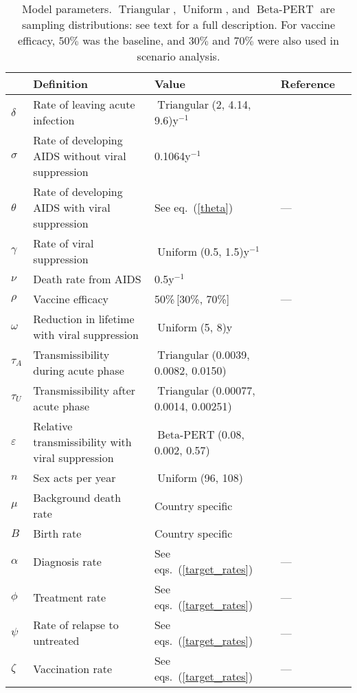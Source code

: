 \documentclass[11pt]{article}
\DeclareMathOperator{\Uniform}{Uniform}
\DeclareMathOperator{\Triangular}{Triangular}
\DeclareMathOperator{\BetaPERT}{Beta-PERT}
\begin{document}
\begin{table}
  \begin{center}
    \begin{tabularx}{\textwidth}{lXlll}
      \hline
      & Definition & Value & Reference \\
      \hline
      $\delta$	& Rate of leaving acute infection
      & $\Triangular$(2, 4.14, 9.6)\;y$^{-1}$
      & \cite{Hollingsworth2008-iy} \\
      $\sigma$	& Rate of developing AIDS without viral suppression
      & 0.1064\;y$^{-1}$ & \cite{Morgan2002-cq} \\
      $\theta$ & Rate of developing AIDS with viral suppression
      & See eq.~(\ref{theta}) & --- \\
      $\gamma$ & Rate of viral suppression
      & $\Uniform$(0.5, 1.5)\;y$^{-1}$
      & \cite{Currie2009-yz} \\
      $\nu$ & Death rate from AIDS & 0.5\;y$^{-1}$
      & \cite{Morgan2002-cq} \\
      $\rho$ & Vaccine efficacy & 50\%\,[30\%, 70\%] & --- \\
      $\omega$	& Reduction in lifetime with viral suppression
      & $\Uniform$(5, 8)\;y
      & \cite{Unaids2014-ue, Samji2013-kf} \\
      $\tau_{A}$ & Transmissibility during acute phase
      & $\Triangular$(0.0039, 0.0082, 0.0150)
      & \cite{Skarbinski2015-ni,Wawer2005-us}\\
      $\tau_{U}$ & Transmissibility after acute phase
      & $\Triangular$(0.00077, 0.0014, 0.00251)
      & \cite{Hughes2012-so} \\
      $\varepsilon$ & Relative transmissibility with
      viral suppression & $\BetaPERT$(0.08, 0.002, 0.57)
      & \cite{Donnell2010-xo} \\
      $n$ & Sex acts per year & $\Uniform$(96, 108)
      & \cite{Wawer2005-us,Abdool_Karim2010-cm}\\
      $\mu$ & Background death rate & Country specific
      & \cite{World_Development_Indicators2013-ee} \\
      $B$ & Birth rate & Country specific
      & \cite{World_Development_Indicators2013-ee, WorldBankpg} \\
      $\alpha$ & Diagnosis rate & See eqs.~(\ref{target_rates}) & --- \\
      $\phi$ & Treatment rate & See eqs.~(\ref{target_rates}) & --- \\
      $\psi$ & Rate of relapse to untreated & See eqs.~(\ref{target_rates})
      & --- \\
      $\zeta$ & Vaccination rate & See eqs.~(\ref{target_rates}) & --- \\
      \hline
    \end{tabularx}
    \caption{Model parameters. $\Triangular$, $\Uniform$,
      and $\BetaPERT$ are sampling distributions: see text for a
      full description.  For vaccine efficacy, $50\%$ was the
      baseline, and $30\%$ and $70\%$ were also used in scenario
      analysis.}
    \label{model_param}
  \end{center}
\end{table}
\end{document}
